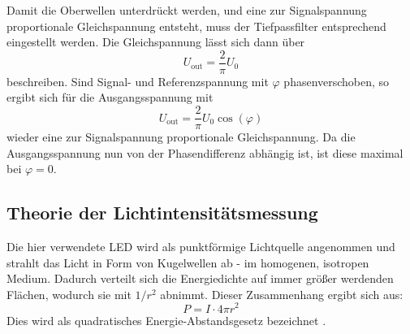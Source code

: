Damit die Oberwellen unterdrückt werden, und eine zur Signalspannung proportionale
Gleichspannung entsteht, muss der Tiefpassfilter entsprechend eingestellt werden.
Die Gleichspannung lässt sich dann über
\begin{equation}
  U_\text{out}=\frac{2}{\pi}U_0
\end{equation}
beschreiben.
Sind Signal- und Referenzspannung mit $\varphi$ phasenverschoben, so ergibt sich für
die Ausgangsspannung mit
\begin{equation}
  U_\text{out}=\frac{2}{\pi}U_0\cos(\varphi) \label{eqn:out}
\end{equation}
wieder eine zur Signalspannung proportionale Gleichspannung. Da die Ausgangsspannung
nun von der Phasendifferenz abhängig ist, ist diese maximal bei $\varphi=0$.

\subsection{Theorie der Lichtintensitätsmessung}
Die hier verwendete LED wird als punktförmige Lichtquelle angenommen und strahlt
das Licht in Form von Kugelwellen ab - im homogenen, isotropen Medium. Dadurch verteilt
sich die Energiedichte auf immer größer werdenden Flächen, wodurch sie mit $1/r^2$ abnimmt.
Dieser Zusammenhang ergibt sich aus:
\begin{equation*}
  P = I \cdot 4\pi r^2
\end{equation*}
Dies wird als quadratisches Energie-Abstandsgesetz bezeichnet \cite{chemie}.
